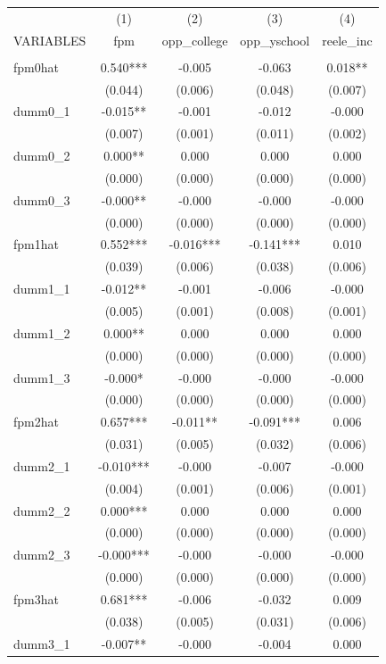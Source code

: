 \documentclass[]{article}
\begin{document}
\begin{tabular}{lcccc} \hline
 & (1) & (2) & (3) & (4) \\
VARIABLES & fpm & opp\_college & opp\_yschool & reele\_inc \\ \hline
 &  &  &  &  \\
fpm0hat & 0.540*** & -0.005 & -0.063 & 0.018** \\
 & (0.044) & (0.006) & (0.048) & (0.007) \\
dumm0\_1 & -0.015** & -0.001 & -0.012 & -0.000 \\
 & (0.007) & (0.001) & (0.011) & (0.002) \\
dumm0\_2 & 0.000** & 0.000 & 0.000 & 0.000 \\
 & (0.000) & (0.000) & (0.000) & (0.000) \\
dumm0\_3 & -0.000** & -0.000 & -0.000 & -0.000 \\
 & (0.000) & (0.000) & (0.000) & (0.000) \\
fpm1hat & 0.552*** & -0.016*** & -0.141*** & 0.010 \\
 & (0.039) & (0.006) & (0.038) & (0.006) \\
dumm1\_1 & -0.012** & -0.001 & -0.006 & -0.000 \\
 & (0.005) & (0.001) & (0.008) & (0.001) \\
dumm1\_2 & 0.000** & 0.000 & 0.000 & 0.000 \\
 & (0.000) & (0.000) & (0.000) & (0.000) \\
dumm1\_3 & -0.000* & -0.000 & -0.000 & -0.000 \\
 & (0.000) & (0.000) & (0.000) & (0.000) \\
fpm2hat & 0.657*** & -0.011** & -0.091*** & 0.006 \\
 & (0.031) & (0.005) & (0.032) & (0.006) \\
dumm2\_1 & -0.010*** & -0.000 & -0.007 & -0.000 \\
 & (0.004) & (0.001) & (0.006) & (0.001) \\
dumm2\_2 & 0.000*** & 0.000 & 0.000 & 0.000 \\
 & (0.000) & (0.000) & (0.000) & (0.000) \\
dumm2\_3 & -0.000*** & -0.000 & -0.000 & -0.000 \\
 & (0.000) & (0.000) & (0.000) & (0.000) \\
fpm3hat & 0.681*** & -0.006 & -0.032 & 0.009 \\
 & (0.038) & (0.005) & (0.031) & (0.006) \\
dumm3\_1 & -0.007** & -0.000 & -0.004 & 0.000 \\

\end{tabular}
\end{document}

